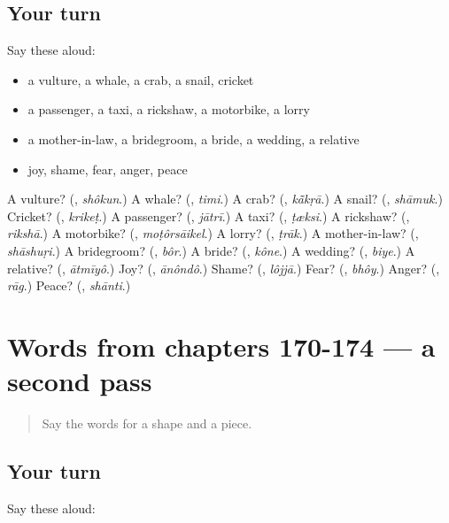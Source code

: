 \subsection*{Your turn}
Say these aloud:

\begin{itemize}
\raggedright
  \item a vulture, a whale, a crab, a snail, cricket
  \item a passenger, a taxi, a rickshaw, a motorbike, a lorry
  \item a mother-in-law, a bridegroom, a bride, a wedding, a relative
  \item joy, shame, fear, anger, peace
\end{itemize}

\begin{tcolorbox}[breakable,colback=teal!4,colframe=teal!35!black,title={Before you move on}]
A vulture? (\textbf{}, \emph{shôkun}.) A whale? (\textbf{}, \emph{timi}.) A crab? (\textbf{}, \emph{kā̃kṛā}.) A snail? (\textbf{}, \emph{shāmuk}.) Cricket? (\textbf{}, \emph{krikeṭ}.) A passenger? (\textbf{}, \emph{jātrī}.) A taxi? (\textbf{}, \emph{ṭæksi}.) A rickshaw? (\textbf{}, \emph{rikshā}.) A motorbike? (\textbf{}, \emph{moṭôrsāikel}.) A lorry? (\textbf{}, \emph{ṭrāk}.) A mother-in-law? (\textbf{}, \emph{shāshuṛi}.) A bridegroom? (\textbf{}, \emph{bôr}.) A bride? (\textbf{}, \emph{kône}.) A wedding? (\textbf{}, \emph{biye}.) A relative? (\textbf{}, \emph{ātmīyô}.) Joy? (\textbf{}, \emph{ānôndô}.) Shame? (\textbf{}, \emph{lôjjā}.) Fear? (\textbf{}, \emph{bhôy}.) Anger? (\textbf{}, \emph{rāg}.) Peace? (\textbf{}, \emph{shānti}.)
\end{tcolorbox}
\section[(dialogue)]{Words from chapters 170-174 — a second pass}

\label{lesson:BN-R174-second-pass-words-from-chapters-170-174}



\begin{quote}
Say the words for a shape and a piece.
\end{quote}

\subsection*{Your turn}
Say these aloud:

